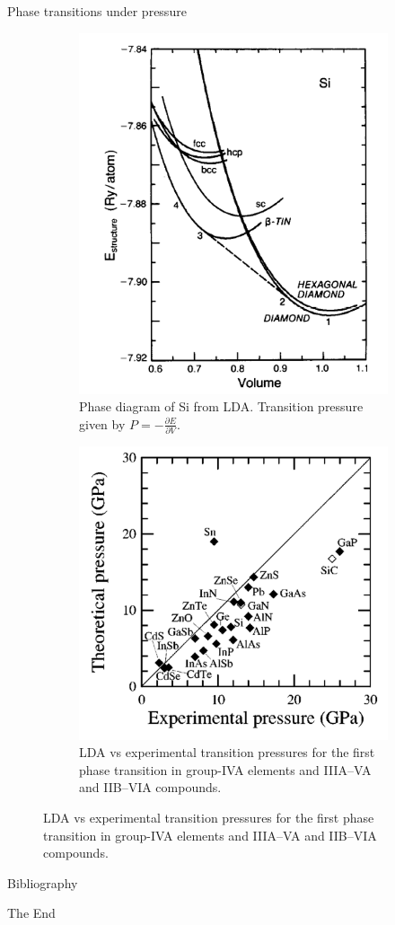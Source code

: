 \documentclass[aspectratio=169]{beamer}
\begin{document}
\begin{frame}{Phase transitions under pressure}

\begin{figure}
    \centering
    \begin{subfigure}{0.45\textwidth}
        \centering
        \includegraphics[width=0.7\linewidth]{lectures/figures/5_phase_diagram_si.png}
    \caption{Phase diagram of Si from LDA.\cite{yinTheoryStaticStructural1982} Transition pressure given by $P = -\frac{\partial E}{\partial V}$.}
    \end{subfigure}
    \begin{subfigure}{0.45\textwidth}
        \centering
        \includegraphics[width=0.8\linewidth]{lectures/figures/8_phase_transition_pressure_III_V_and_II-VI.png}
    \caption{LDA vs experimental transition pressures for the first phase transition in group-IVA elements and IIIA–VA and IIB–VIA compounds.\cite{mujicaHighpressurePhasesGroupIV2003}}
    \end{subfigure}
\end{figure} 

\end{frame} 

    \begin{frame}[allowframebreaks]{Bibliography}
        
        
    \end{frame}



    \begin{frame}
        \Huge{\centerline{The End}}
    \end{frame}
\end{document}

